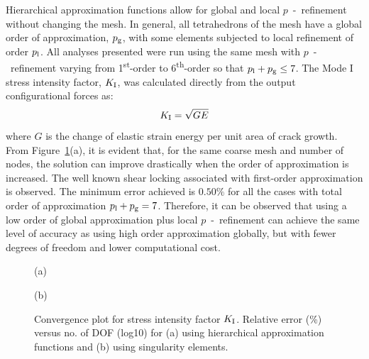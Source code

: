 \documentclass[onecolumn]{svjour3}
\begin{document}
Hierarchical approximation functions allow for global and local $p$~-~refinement without changing the mesh.
In general, all tetrahedrons of the mesh have a global order of approximation, $p_{\rm g}$, with some elements subjected to local refinement of order $p_{\rm{l}}$.
All analyses presented were run using the same mesh with $p$~-~refinement varying from 1\textsuperscript{st}-order to 6\textsuperscript{th}-order so that $p_{\rm l} + p_{\rm g} \leq 7$.
The Mode I stress intensity factor, $K_{\rm I}$, was calculated directly from the output configurational forces as: 
\begin{equation}\label{eq:SIF_g_c}
K_{\rm I} = \sqrt{GE}
\end{equation}
where $G$ is the change of elastic strain energy per unit area of crack growth.
From Figure~\ref{fig:plate_conv}(a), it is evident that, for the same coarse mesh and number of nodes, the solution can improve drastically when the order of approximation is increased. 
The well known shear locking associated with first-order approximation is observed. 
The minimum error achieved is $0.50\%$ for all the cases with total order of approximation  $p_{\rm l} + p_{\rm g} = 7$. 
Therefore, it can be observed that using a low order of global approximation plus local $p$~-~refinement 
can achieve the same level of accuracy as using high order approximation globally, but with fewer degrees of freedom and lower computational cost.
\begin{figure}[h]
	\centering

	
	\begin{minipage}{.45\textwidth}
		\begin{centering} (a) \end{centering}
	\end{minipage}%
	\begin{minipage}{.45\textwidth}
\begin{centering} (b) \end{centering}
	\end{minipage}
	\caption{Convergence plot for stress intensity factor $K_{\rm I}$. Relative error (\%) versus no. of DOF (log10) for (a) using hierarchical approximation functions and (b) using singularity elements.}
			\label{fig:plate_conv}
\end{figure}
\end{document}
